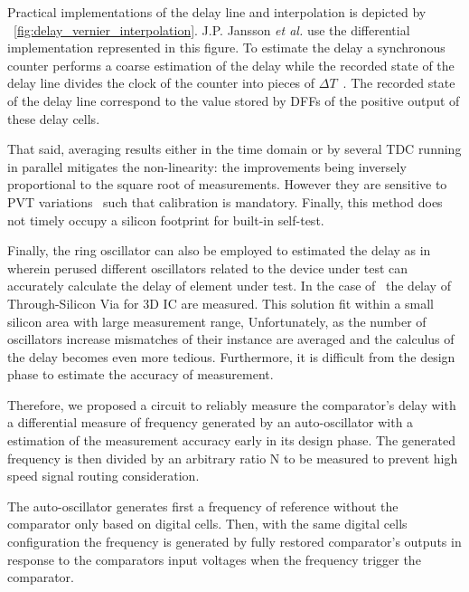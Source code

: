 Practical implementations of the delay line and interpolation is depicted by \figurename~\ref{fig:delay_vernier_interpolation}. J.P. Jansson \textit{et al.} use the differential implementation represented in this figure. To estimate the delay a synchronous counter performs a coarse estimation of the delay while the recorded state of the delay line divides the clock of the counter into pieces of \(\Delta T\)~\cite{1637593}. The recorded state of the delay line correspond to the value stored by DFFs of the positive output of these delay cells.

That said, averaging results either in the time domain or by several TDC running in parallel mitigates the non-linearity: the improvements being inversely proportional to the square root of measurements. However they are sensitive to PVT variations~\cite{6233014, 5256168} such that calibration is mandatory. Finally, this method does not timely occupy a silicon footprint for built-in self-test.

Finally, the ring oscillator can also be employed to estimated the delay as in~\cite{8267856} wherein perused different oscillators related to the device under test can accurately calculate the delay of element under test. In the case of~\cite{8267856} the delay of Through-Silicon Via for 3D IC are measured. This solution fit within a small silicon area with large measurement range, Unfortunately, as the number of oscillators increase mismatches of their instance are averaged and the calculus of the delay becomes even more tedious. Furthermore, it is difficult from the design phase to estimate the accuracy of measurement.

Therefore, we proposed a circuit to reliably measure the comparator's delay with a differential measure of frequency generated by an auto-oscillator with a estimation of the measurement accuracy early in its design phase. The generated frequency is then divided by an arbitrary ratio N to be measured to prevent high speed signal routing consideration.

The auto-oscillator generates first a frequency of reference without the comparator only based on digital cells. Then, with the same digital cells configuration the frequency is generated by fully restored comparator's outputs in response to the comparators input voltages when the frequency trigger the comparator.

